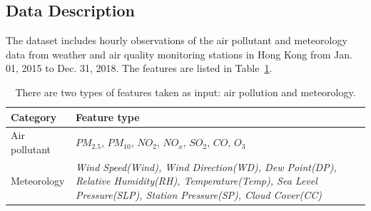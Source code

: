 


\subsection{Data Description}
\label{section:datadescription}

The dataset includes hourly observations of the air pollutant and meteorology data from weather and air quality monitoring stations in Hong Kong from Jan. 01, 2015 to Dec. 31, 2018.
The features are listed in Table~\ref{table:feature_list}.

\begin{table}[h!]
\centering
\caption{There are two types of features taken as input: air pollution and meteorology. }
\begin{tabular}{|p{2cm}|p{5.2cm}|} 
\hline
 Category & Feature type \\ [0.5ex] 
\hline
    Air pollutant&$PM_{2.5}$, $PM_{10}$, $NO_{2}$, $NO_{x}$, $SO_{2}$, $CO$, $O_3$\\[0.4ex] 
\hline
    Meteorology&\textit{Wind Speed(Wind), Wind Direction(WD), Dew Point(DP), Relative Humidity(RH), Temperature(Temp), Sea Level Pressure(SLP), Station Pressure(SP), Cloud Cover(CC)}\\
\hline
\end{tabular}
\label{table:feature_list}
\end{table}

